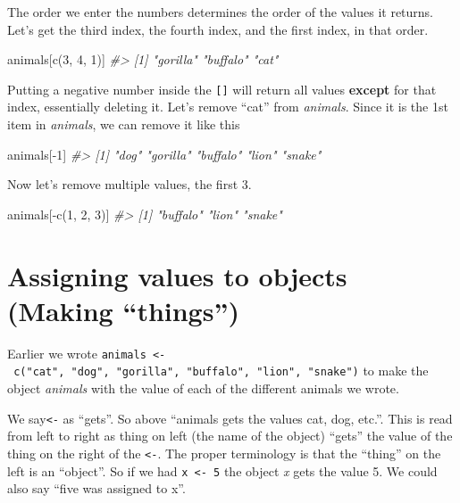 \documentclass[
  12pt,
]{book}
\newenvironment{Shaded}{\begin{snugshade}}{\end{snugshade}}
\newcommand{\CommentTok}[1]{\textcolor[rgb]{0.37,0.37,0.37}{\textit{#1}}}
\newcommand{\DecValTok}[1]{\textcolor[rgb]{0.06,0.06,0.06}{#1}}
\newcommand{\FunctionTok}[1]{\textcolor[rgb]{0,0,0}{#1}}
\newcommand{\NormalTok}[1]{#1}
\newcommand{\SpecialCharTok}[1]{\textcolor[rgb]{0,0,0}{#1}}
\begin{document}
The order we enter the numbers determines the order of the values it returns. Let's get the third index, the fourth index, and the first index, in that order.

\begin{Shaded}
\begin{Highlighting}[]
\NormalTok{animals[}\FunctionTok{c}\NormalTok{(}\DecValTok{3}\NormalTok{, }\DecValTok{4}\NormalTok{, }\DecValTok{1}\NormalTok{)]}
\CommentTok{\#\textgreater{} [1] "gorilla" "buffalo" "cat"}
\end{Highlighting}
\end{Shaded}

Putting a negative number inside the \texttt{{[}{]}} will return all values \textbf{except} for that index, essentially deleting it. Let's remove ``cat'' from \emph{animals}. Since it is the 1st item in \emph{animals}, we can remove it like this

\begin{Shaded}
\begin{Highlighting}[]
\NormalTok{animals[}\SpecialCharTok{{-}}\DecValTok{1}\NormalTok{]}
\CommentTok{\#\textgreater{} [1] "dog"     "gorilla" "buffalo" "lion"    "snake"}
\end{Highlighting}
\end{Shaded}

Now let's remove multiple values, the first 3.

\begin{Shaded}
\begin{Highlighting}[]
\NormalTok{animals[}\SpecialCharTok{{-}}\FunctionTok{c}\NormalTok{(}\DecValTok{1}\NormalTok{, }\DecValTok{2}\NormalTok{, }\DecValTok{3}\NormalTok{)]}
\CommentTok{\#\textgreater{} [1] "buffalo" "lion"    "snake"}
\end{Highlighting}
\end{Shaded}

\hypertarget{assignment}{%
\section{Assigning values to objects (Making ``things'')}\label{assignment}}

Earlier we wrote \texttt{animals\ \textless{}-\ c("cat",\ "dog",\ "gorilla",\ "buffalo",\ "lion",\ "snake")} to make the object \emph{animals} with the value of each of the different animals we wrote.

We say\texttt{\textless{}-} as ``gets''. So above ``animals gets the values cat, dog, etc.''. This is read from left to right as thing on left (the name of the object) ``gets'' the value of the thing on the right of the \texttt{\textless{}-}. The proper terminology is that the ``thing'' on the left is an ``object''. So if we had \texttt{x\ \textless{}-\ 5} the object \emph{x} gets the value 5. We could also say ``five was assigned to x''.
\end{document}
